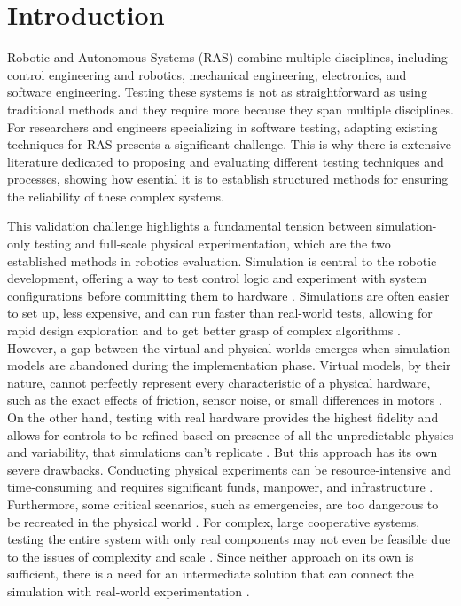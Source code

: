 \chapter{Introduction} \label{chap:introduction}

Robotic and Autonomous Systems (RAS) combine multiple disciplines, including control engineering and robotics, mechanical engineering, electronics, and software engineering.  Testing these systems is not as straightforward as using traditional methods and they require more because they span multiple disciplines. For researchers and engineers specializing in software testing, adapting existing techniques for RAS presents a significant challenge. This is why there is extensive literature dedicated to proposing and evaluating different testing techniques and processes, showing how esential it is to establish structured methods for ensuring the reliability of these complex systems. \cite{AMV23}

This validation challenge highlights a fundamental tension between simulation-only testing and full-scale physical experimentation, which are the two established methods in robotics evaluation. Simulation is central to the robotic development, offering a way to test control logic and experiment with system configurations before committing them to hardware \cite{Hu05, Mic04}. Simulations are often easier to set up, less expensive, and can run faster than real-world tests, allowing for rapid design exploration and to get better grasp of complex algorithms \cite{Mic04, Dos17, BM18}. However, a gap between the virtual and physical worlds emerges when simulation models are abandoned during the implementation phase. Virtual models, by their nature, cannot perfectly represent every characteristic of a physical hardware, such as the exact effects of friction, sensor noise, or small differences in motors \cite{Hu05, BM18}. On the other hand, testing with real hardware provides the highest fidelity and allows for controls to be refined based on presence of all the unpredictable physics and variability, that simulations can’t replicate \cite{Hu05, Cas21}. But this approach has its own severe drawbacks. Conducting physical experiments can be resource-intensive and time-consuming and requires significant funds, manpower, and infrastructure \cite{Hu05, Dos17, Mic04}. Furthermore, some critical scenarios, such as emergencies, are too dangerous to be recreated in the physical world \cite{Hu05}. For complex, large cooperative systems, testing the entire system with only real components may not even be feasible due to the issues of complexity and scale \cite{Hu05}. Since neither approach on its own is sufficient, there is a need for an intermediate solution that can connect the simulation with real-world experimentation \cite{Hu05}.

